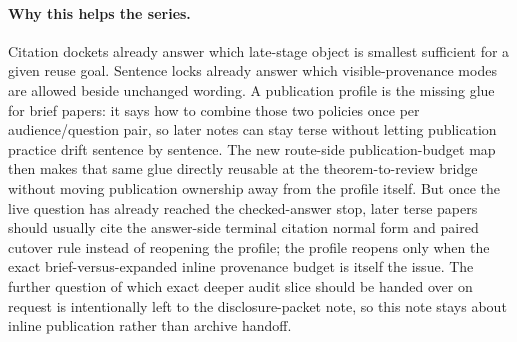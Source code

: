 \documentclass[11pt]{article}
\begin{document}
\paragraph{Why this helps the series.}
Citation dockets already answer which late-stage object is smallest sufficient for a given reuse goal.
Sentence locks already answer which visible-provenance modes are allowed beside unchanged wording.
A publication profile is the missing glue for brief papers: it says how to combine those two policies once per audience/question pair, so later notes can stay terse without letting publication practice drift sentence by sentence. The new route-side publication-budget map then makes that same glue directly reusable at the theorem-to-review bridge without moving publication ownership away from the profile itself.
But once the live question has already reached the checked-answer stop, later terse papers should usually cite the answer-side terminal citation normal form and paired cutover rule instead of reopening the profile; the profile reopens only when the exact brief-versus-expanded inline provenance budget is itself the issue.\cite{series:challengeanswerreviewmenus,series:pairedterminalcitationdiscipline,series:pairedterminalcutoverrules}
The further question of which exact deeper audit slice should be handed over on request is intentionally left to the disclosure-packet note, so this note stays about inline publication rather than archive handoff.
\end{document}
